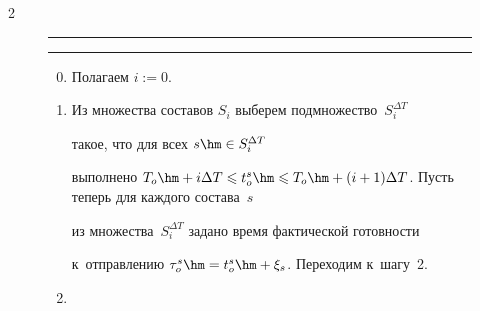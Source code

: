 \begin{multicols}{2}
\renewcommand{\figurename}{\protect\bf Алгоритм}





\begin{figure}[b] %


\hrule





\vspace*{-4pt}





\Caption{\ }  





\vspace*{3pt}  


\hrule





\vspace*{2pt}





    \begin{enumerate}[1.]


        \setcounter{enumi}{-1}





        \item


        Полагаем $i := 0$.





        \item


        Из множества составов $S_i$ выберем подмножество~$S_i^{\Delta T}$ 


        такое, что для всех $s \hm\in S_i^{\Delta T}$


        выполнено $T_o \hm+ i\Delta T \leqslant t^s_o \hm\leqslant T_o \hm+ 


        (i+1)\Delta T$. Пусть теперь для каждого состава~$s$


        из множества~$S_i^{\Delta T}$ задано время фактической готовности 


        к~отправлению $\tau^s_o \hm= t^s_o \hm+ \xi_s$. Переходим к~шагу~2.





        \item



\end{enumerate}
\end{figure}
\end{multicols}
